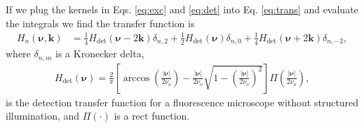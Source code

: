 \documentclass[11pt]{article}
\providecommand{\mb}[1]{\mathbf{#1}}
\providecommand{\bs}[1]{\boldsymbol{#1}}
\begin{document}
If we plug the kernels in Eqs. \ref{eq:exc} and \ref{eq:det} into Eq.
\ref{eq:trans} and evaluate the integrals we find the transfer function is
\begin{align}
  H_n(\bs{\nu}, \mb{k}) &= \frac{1}{4}H_{\text{det}}(\bs{\nu} - 2\mb{k})\delta_{n,2} + \frac{1}{2}H_{\text{det}}(\bs{\nu})\delta_{n,0} + \frac{1}{4}H_{\text{det}}(\bs{\nu} + 2\mb{k})\delta_{n,-2},
\end{align}
where $\delta_{n,m}$ is a Kronecker delta,
\begin{align}
  H_{\text{det}}(\bs{\nu}) = \frac{2}{\pi}\left[\arccos\left(\frac{|\bs{\nu}|}{2\nu_o}\right) - \frac{|\bs{\nu}|}{2\nu_o}\sqrt{1 - \left(\frac{|\bs{\nu}|}{2\nu_o}\right)^2}\right]\Pi\left(\frac{|\bs{\nu}|}{2\nu_o}\right),
\end{align}
is the detection transfer function for a fluorescence microscope without
structured illumination, and $\Pi\left(\cdot\right)$ is a rect function. 
\end{document}
